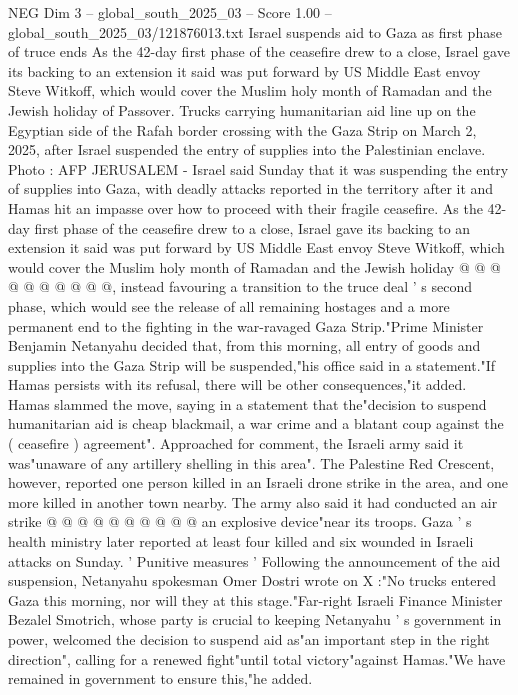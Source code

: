 \begin{textsample}{NEG Dim 3 – global\_south\_2025\_03 – Score 1.00 – global\_south\_2025\_03/121876013.txt}  \label{ex:f3_neg_424}
Israel suspends aid to Gaza as first phase of truce ends As the 42-day first phase of the ceasefire drew to a close, Israel gave its backing to an extension it said was put forward by US Middle East envoy Steve Witkoff, which would cover the Muslim holy month of Ramadan and the Jewish holiday of Passover.
Trucks carrying humanitarian aid line up on the Egyptian side of the Rafah border crossing with the Gaza Strip on March 2, 2025, after Israel suspended the entry of supplies into the Palestinian enclave.
Photo : AFP JERUSALEM - Israel said Sunday that it was suspending the entry of supplies into Gaza, with deadly attacks reported in the territory after it and Hamas hit an impasse over how to proceed with their fragile ceasefire.
As the 42-day first phase of the ceasefire drew to a close, Israel gave its backing to an extension it said was put forward by US Middle East envoy Steve Witkoff, which would cover the Muslim holy month of Ramadan and the Jewish holiday @ @ @ @ @ @ @ @ @ @, instead favouring a transition to the truce deal ' s second phase, which would see the release of all remaining hostages and a more permanent end to the fighting in the war-ravaged Gaza Strip."Prime Minister Benjamin Netanyahu decided that, from this morning, all entry of goods and supplies into the Gaza Strip will be suspended,"his office said in a statement."If Hamas persists with its refusal, there will be other consequences,"it added.
Hamas slammed the move, saying in a statement that the"decision to suspend humanitarian aid is cheap blackmail, a war crime and a blatant coup against the ( ceasefire ) agreement".
Approached for comment, the Israeli army said it was"unaware of any artillery shelling in this area".
The Palestine Red Crescent, however, reported one person killed in an Israeli drone strike in the area, and one more killed in another town nearby.
The army also said it had conducted an air strike @ @ @ @ @ @ @ @ @ @ an explosive device"near its troops.
Gaza ' s health ministry later reported at least four killed and six wounded in Israeli attacks on Sunday. ' Punitive measures ' Following the announcement of the aid suspension, Netanyahu spokesman Omer Dostri wrote on X :"No trucks entered Gaza this morning, nor will they at this stage."Far-right Israeli Finance Minister Bezalel Smotrich, whose party is crucial to keeping Netanyahu ' s government in power, welcomed the decision to suspend aid as"an important step in the right direction", calling for a renewed fight"until total victory"against Hamas."We have remained in government to ensure this,"he added.

\end{textsample}
